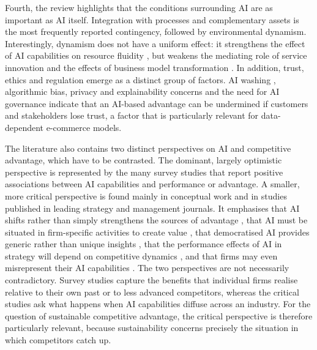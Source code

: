 Fourth, the review highlights that the conditions surrounding AI are as important as AI itself. Integration with processes and complementary assets is the most frequently reported contingency, followed by environmental dynamism. Interestingly, dynamism does not have a uniform effect: it strengthens the effect of AI capabilities on resource fluidity , but weakens the mediating role of service innovation  and the effects of business model transformation . In addition, trust, ethics and regulation emerge as a distinct group of factors. AI washing , algorithmic bias, privacy and explainability concerns  and the need for AI governance  indicate that an AI-based advantage can be undermined if customers and stakeholders lose trust, a factor that is particularly relevant for data-dependent e-commerce models.

The literature also contains two distinct perspectives on AI and competitive advantage, which have to be contrasted. The dominant, largely optimistic perspective is represented by the many survey studies that report positive associations between AI capabilities and performance or advantage. A smaller, more critical perspective is found mainly in conceptual work and in studies published in leading strategy and management journals. It emphasises that AI shifts rather than simply strengthens the sources of advantage , that AI must be situated in firm-specific activities to create value , that democratised AI provides generic rather than unique insights , that the performance effects of AI in strategy will depend on competitive dynamics , and that firms may even misrepresent their AI capabilities . The two perspectives are not necessarily contradictory. Survey studies capture the benefits that individual firms realise relative to their own past or to less advanced competitors, whereas the critical studies ask what happens when AI capabilities diffuse across an industry. For the question of sustainable competitive advantage, the critical perspective is therefore particularly relevant, because sustainability concerns precisely the situation in which competitors catch up.

